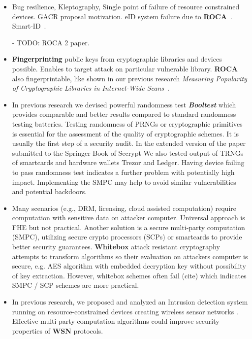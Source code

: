 \documentclass[
  digital, %
  twoside, %
  table,   %
  lof,     %
  lot,     %
]{fithesis3}
\newcounter{ph4_show_guides}
\theoremstyle{definition}
\theoremstyle{remark}
\begin{document}
\begin{ecmmnt}%
\begin{itemize}
	\item Bug resilience, Kleptography, Single point of failure of resource constrained devices. GACR proposal motivation. eID system failure due to {\bf{ROCA}}~\cite{2017-ccs-nemec}. Smart-ID~\cite{smart_id_ee}. 
	
	- TODO: ROCA 2 paper.
	
	\item {\bf{Fingerprinting}} public keys from cryptographic libraries and devices possible. Enables to target attack on particular vulnerable library. {\bf{ROCA}} also fingerprintable, like shown in our previous research {\it{Measuring Popularity of Cryptographic Libraries in Internet-Wide Scans}}~\cite{2017-acsac-nemec}.
	
	\item In previous research we devised powerful randomness test {\bf{\emph{Booltest}}} \cite{booltest_secrypt2017} which provides comparable and better results compared to standard randomness testing batteries. Testing randomness of PRNGs or cryptographic primitives is essential for the assessment of the quality of cryptographic schemes. It is usually the first step of a security audit. In the extended version of the paper submitted to the Springer Book of Secrypt We also tested output of TRNGs of smartcards and hardware wallets Trezor and Ledger. Having device failing to pass randomness test indicates a further problem with potentially high impact. Implementing the SMPC may help to avoid similar vulnerabilities and potential backdoors. 
	
	\item Many scenarios (e.g., DRM, licensing, cloud assisted computation) require computation with sensitive data on attacker computer. Universal approach is FHE but not practical. Another solution is a secure multi-party computation (SMPC), utilizing secure crypto processors (SCPs) or smartcards to provide better security guarantees. {\bf{Whitebox}} attack resistant cryptography \cite{whitebox_klinec_santacrypt2013,Klinec2013thesis} attempts to transform algorithms so their evaluation on attackers computer is secure, e.g. AES algorithm with embedded decryption key without possibility of key extraction. However, whitebox schemes often fail (cite) which indicates SMPC / SCP schemes are more practical.
	
	\item In previous research, we proposed and analyzed an Intrusion detection system running on resource-constrained devices creating wireless sensor networks \cite{wsnprotectlayer}. Effective multi-party computation algorithms could improve security properties of {\bf{WSN}} protocols.
	

\end{itemize}
\end{ecmmnt}
\end{document}
